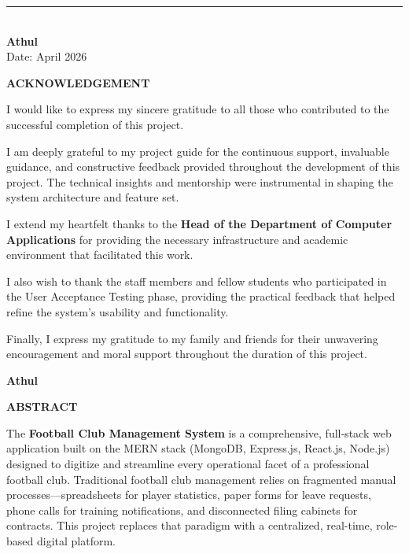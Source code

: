 \documentclass[12pt,a4paper,oneside]{report}
\newcommand{\reportdate}{April 2026}
\begin{document}
\noindent
\begin{flushright}
  \rule{5cm}{0.4pt}\\[4pt]
  \textbf{Athul}\\
  Date: \reportdate
\end{flushright}

\newpage
\thispagestyle{empty}
\begin{center}
  {\Large\bfseries ACKNOWLEDGEMENT}\\[24pt]
\end{center}

I would like to express my sincere gratitude to all those who contributed to the successful completion of this project.

I am deeply grateful to my project guide for the continuous support, invaluable guidance, and constructive feedback provided throughout the development of this project. The technical insights and mentorship were instrumental in shaping the system architecture and feature set.

I extend my heartfelt thanks to the \textbf{Head of the Department of Computer Applications} for providing the necessary infrastructure and academic environment that facilitated this work.

I also wish to thank the staff members and fellow students who participated in the User Acceptance Testing phase, providing the practical feedback that helped refine the system's usability and functionality.

Finally, I express my gratitude to my family and friends for their unwavering encouragement and moral support throughout the duration of this project.

\vspace{1.5cm}
\begin{flushright}
  \textbf{Athul}
\end{flushright}

\newpage
\thispagestyle{empty}
\begin{center}
  {\Large\bfseries ABSTRACT}\\[24pt]
\end{center}

The \textbf{Football Club Management System} is a comprehensive, full-stack web application built on the MERN stack (MongoDB, Express.js, React.js, Node.js) designed to digitize and streamline every operational facet of a professional football club. Traditional football club management relies on fragmented manual processes---spreadsheets for player statistics, paper forms for leave requests, phone calls for training notifications, and disconnected filing cabinets for contracts. This project replaces that paradigm with a centralized, real-time, role-based digital platform.
\end{document}
